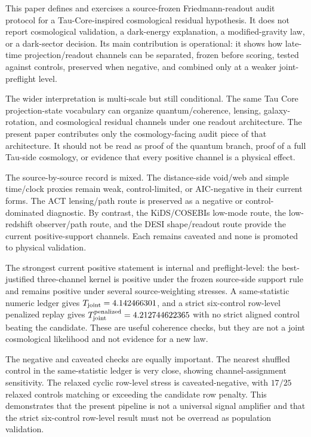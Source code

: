 \documentclass[11pt]{article}
\begin{document}
This paper defines and exercises a source-frozen Friedmann-readout audit
protocol for a Tau-Core-inspired cosmological residual hypothesis.  It does not
report cosmological validation, a dark-energy explanation, a modified-gravity
law, or a dark-sector decision.  Its main contribution is operational: it shows
how late-time projection/readout channels can be separated, frozen before
scoring, tested against controls, preserved when negative, and combined only at
a weaker joint-preflight level.

The wider interpretation is multi-scale but still conditional.  The same Tau
Core projection-state vocabulary can organize quantum/coherence, lensing,
galaxy-rotation, and cosmological residual channels under one readout
architecture.  The present paper contributes only the cosmology-facing audit
piece of that architecture.  It should not be read as proof of the quantum
branch, proof of a full Tau-side cosmology, or evidence that every positive
channel is a physical effect.

The source-by-source record is mixed.  The distance-side void/web and simple
time/clock proxies remain weak, control-limited, or AIC-negative in their
current forms.  The ACT lensing/path route is preserved as a negative or
control-dominated diagnostic.  By contrast, the KiDS/COSEBIs low-mode route,
the low-redshift observer/path route, and the DESI shape/readout route provide
the current positive-support channels.  Each remains caveated and none is
promoted to physical validation.

The strongest current positive statement is internal and preflight-level: the
best-justified three-channel kernel is positive under the frozen source-side
support rule and remains positive under several source-weighting stresses.  A
same-statistic numeric ledger gives \(T_{\rm joint}=4.142466301\), and a
strict six-control row-level penalized replay gives
\(T_{\rm joint}^{\rm penalized}=4.212744622365\) with no strict aligned control
beating the candidate.  These are useful coherence checks, but they are not a
joint cosmological likelihood and not evidence for a new law.

The negative and caveated checks are equally important.  The nearest shuffled
control in the same-statistic ledger is very close, showing channel-assignment
sensitivity.  The relaxed cyclic row-level stress is caveated-negative, with
\(17/25\) relaxed controls matching or exceeding the candidate row penalty.
This demonstrates that the present pipeline is not a universal signal
amplifier and that the strict six-control row-level result must not be
overread as population validation.
\end{document}

